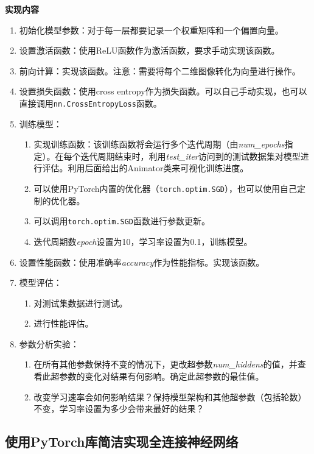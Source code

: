 \documentclass[12pt]{article}
\begin{document}
\textbf{实现内容}
\begin{enumerate}
    \item 初始化模型参数：对于每一层都要记录一个权重矩阵和一个偏置向量。
    \item 设置激活函数：使用ReLU函数作为激活函数，要求手动实现该函数。
    \item 前向计算：实现该函数。注意：需要将每个二维图像转化为向量进行操作。
    \item 设置损失函数：使用cross entropy作为损失函数。可以自己手动实现，也可以直接调用\texttt{nn.CrossEntropyLoss}函数。
    \item 训练模型：
    \begin{enumerate}
        \item 实现训练函数：该训练函数将会运行多个迭代周期（由\textit{num\_epochs}指定）。在每个迭代周期结束时，利用\textit{test\_iter}访问到的测试数据集对模型进行评估。利用后面给出的Animator类来可视化训练进度。
        \item 可以使用PyTorch内置的优化器（\texttt{torch.optim.SGD}），也可以使用自己定制的优化器。
        \item 可以调用\texttt{torch.optim.SGD}函数进行参数更新。
        \item 迭代周期数\textit{epoch}设置为10，学习率设置为0.1，训练模型。
    \end{enumerate}
    \item 设置性能函数：使用准确率\textit{accuracy}作为性能指标。实现该函数。
    \item 模型评估：
    \begin{enumerate}
        \item 对测试集数据进行测试。
        \item 进行性能评估。
    \end{enumerate}
    \item 参数分析实验：
    \begin{enumerate}
        \item 在所有其他参数保持不变的情况下，更改超参数\textit{num\_hiddens}的值，并查看此超参数的变化对结果有何影响。确定此超参数的最佳值。
        \item 改变学习速率会如何影响结果？保持模型架构和其他超参数（包括轮数）不变，学习率设置为多少会带来最好的结果？
    \end{enumerate}
\end{enumerate}

\subsection{\textbf{使用PyTorch库简洁实现全连接神经网络}}
\end{document}
